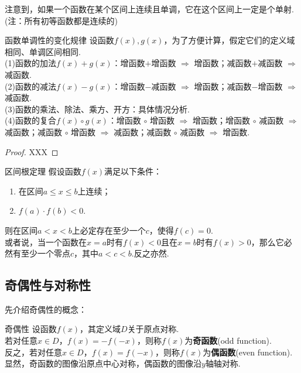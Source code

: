 \documentclass[lang=cn, zihao=5]{elegantbook}
\begin{document}
注意到，如果一个函数在某个区间上连续且单调，它在这个区间上一定是个单射.(注：所有初等函数都是连续的)

\begin{proposition}{函数单调性的变化规律}
    设函数$f(x),g(x)$，为了方便计算，假定它们的定义域相同、单调区间相同.\\
    (1)函数的加法$f(x)+g(x)$：增函数$+$增函数 $\Rightarrow$ 增函数；减函数$+$减函数 $\Rightarrow$ 减函数.\\
    (2)函数的减法$f(x)-g(x)$：增函数$-$减函数 $\Rightarrow$ 增函数；减函数$-$增函数 $\Rightarrow$ 减函数.\\
    (3)函数的乘法、除法、乘方、开方：具体情况分析.\\
    (4)函数的复合$f(x) \circ g(x)$：增函数 $\circ$ 增函数 $\Rightarrow$ 增函数；增函数 $\circ$ 减函数 $\Rightarrow$ 减函数；减函数 $\circ$ 增函数 $\Rightarrow$ 减函数；减函数 $\circ$ 减函数 $\Rightarrow$ 增函数.
\end{proposition}
\begin{proof}
    XXX
\end{proof}

\begin{theorem}{区间根定理}
    假设函数$f(x)$满足以下条件：
    \begin{enumerate}
        \item 在区间$a \leq x \leq b$上连续；
        \item $f(a) \cdot f(b)<0$.
    \end{enumerate}
    则在区间$a<x<b$上必定存在至少一个$c$，使得$f(c)=0$.\\
    或者说，当一个函数在$x=a$时有$f(x)<0$且在$x=b$时有$f(x)>0$，那么它必然有至少一个零点$c$，其中$a<c<b$.反之亦然.
\end{theorem}

\subsection{奇偶性与对称性}

先介绍奇偶性的概念：

\begin{definition}{奇偶性} %
    设函数$f(x)$，其定义域$D$关于原点对称.\\
    若对任意$x \in D$，$f(x)=-f(-x)$，则称$f(x)$为\textbf{奇函数}(odd function).\\
    反之，若对任意$x \in D$，$f(x)=f(-x)$，则称$f(x)$为\textbf{偶函数}(even function).\\
    显然，奇函数的图像沿原点中心对称，偶函数的图像沿$y$轴轴对称.
\end{definition}
\end{document}
